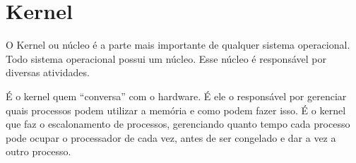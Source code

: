 
\chapter{Kernel}

O Kernel ou núcleo é a parte mais importante de
qualquer sistema operacional. Todo sistema operacional possui um núcleo. Esse
núcleo é responsável por diversas atividades.

É o kernel quem ``conversa'' com o hardware. É ele o responsável por gerenciar
quais processos podem utilizar a memória e como podem fazer isso. É o kernel
que faz o escalonamento de processos, gerenciando quanto tempo cada processo
pode ocupar o processador de cada vez, antes de ser congelado e dar a vez a
outro processo.
